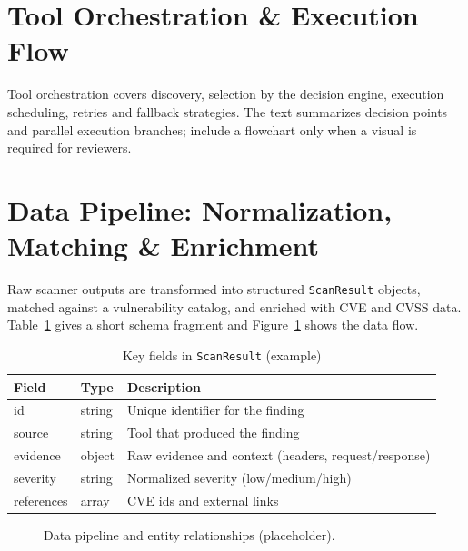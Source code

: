 
\section{Tool Orchestration \& Execution Flow}

Tool orchestration covers discovery, selection by the decision engine, execution scheduling, retries and fallback strategies. The text summarizes decision points and parallel execution branches; include a flowchart only when a visual is required for reviewers.


\section{Data Pipeline: Normalization, Matching \& Enrichment}

Raw scanner outputs are transformed into structured \texttt{ScanResult} objects, matched against a vulnerability catalog, and enriched with CVE and CVSS data. Table~\ref{tab:schema} gives a short schema fragment and Figure~\ref{fig:dataflow} shows the data flow.

\begin{table}[ht]
\centering
\caption{Key fields in \texttt{ScanResult} (example)}
\label{tab:schema}
\begin{tabularx}{\textwidth}{|l|l|X|}
\hline
Field & Type & Description \\
\hline
id & string & Unique identifier for the finding \\
\hline
source & string & Tool that produced the finding \\
\hline
evidence & object & Raw evidence and context (headers, request/response) \\
\hline
severity & string & Normalized severity (low/medium/high) \\
\hline
references & array & CVE ids and external links \\
\hline
\end{tabularx}
\end{table}

\begin{figure}[ht]
\centering
{}
\caption{Data pipeline and entity relationships (placeholder).}
\label{fig:dataflow}
\end{figure}

